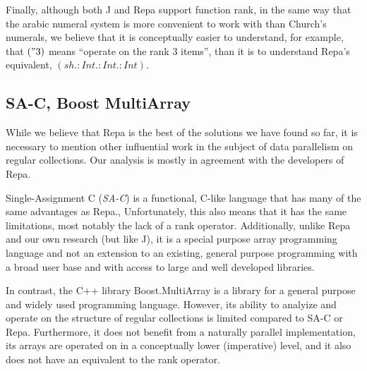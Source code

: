 Finally, although both J and Repa support function rank, 
in the same way that the arabic numeral system is more convenient to work with than Church's numerals, %
we believe that it is conceptually easier to understand, for example, that $(" 3)$ means ``operate on the rank 3 items'', than it is to understand Repa's equivalent, $(sh.:Int.:Int.:Int)$.

\subsection{SA-C, Boost MultiArray}
While we believe that Repa is the best of the solutions we have found so far, 
it is necessary to mention other influential work in the subject of data parallelism on regular collections.
Our analysis is mostly in agreement with the developers of Repa.\cite{dph}

Single-Assignment C (\textit{SA-C}) is a functional, C-like language 
that has many of the same advantages as Repa.\cite{dph}, \cite{sac}
Unfortunately, this also means that it has the same limitations, most notably the lack of a rank operator.
Additionally, unlike Repa and our own research (but like J), 
it is a special purpose array programming language and 
not an extension to an existing, general purpose programming with a broad user base and 
with access to large and well developed libraries.

In contrast, the C++ library Boost.MultiArray is a library for a general purpose and widely used programming language. \cite{boost}
However, its ability to analyize and operate on the structure of regular collections is limited compared to SA-C or Repa.
Furthermore, it does not benefit from a naturally parallel implementation, 
its arrays are operated on in a conceptually lower (imperative) level, 
and it also does not have an equivalent to the rank operator. 
